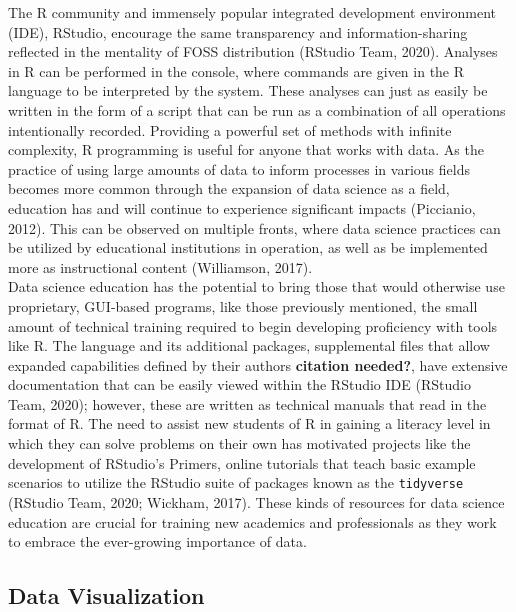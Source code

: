 \documentclass[english,man,floatsintext]{apa6}
\begin{document}
The R community and immensely popular integrated development environment (IDE), RStudio, encourage the same transparency and information-sharing reflected in the mentality of FOSS distribution (RStudio Team, 2020). Analyses in R can be performed in the console, where commands are given in the R language to be interpreted by the system. These analyses can just as easily be written in the form of a script that can be run as a combination of all operations intentionally recorded. Providing a powerful set of methods with infinite complexity, R programming is useful for anyone that works with data. As the practice of using large amounts of data to inform processes in various fields becomes more common through the expansion of data science as a field, education has and will continue to experience significant impacts (Piccianio, 2012). This can be observed on multiple fronts, where data science practices can be utilized by educational institutions in operation, as well as be implemented more as instructional content (Williamson, 2017).\\
Data science education has the potential to bring those that would otherwise use proprietary, GUI-based programs, like those previously mentioned, the small amount of technical training required to begin developing proficiency with tools like R. The language and its additional packages, supplemental files that allow expanded capabilities defined by their authors \textbf{citation needed?}, have extensive documentation that can be easily viewed within the RStudio IDE (RStudio Team, 2020); however, these are written as technical manuals that read in the format of R. The need to assist new students of R in gaining a literacy level in which they can solve problems on their own has motivated projects like the development of RStudio's Primers, online tutorials that teach basic example scenarios to utilize the RStudio suite of packages known as the \texttt{tidyverse} (RStudio Team, 2020; Wickham, 2017). These kinds of resources for data science education are crucial for training new academics and professionals as they work to embrace the ever-growing importance of data.

\hypertarget{data-visualization}{%
\subsection{Data Visualization}\label{data-visualization}}
\end{document}
